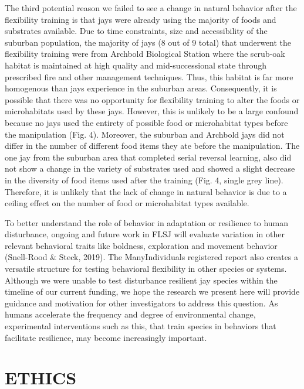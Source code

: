 \documentclass[
]{article}
\begin{document}
The third potential reason we failed to see a change in natural behavior
after the flexibility training is that jays were already using the
majority of foods and substrates available. Due to time constraints,
size and accessibility of the suburban population, the majority of jays
(8 out of 9 total) that underwent the flexibility training were from
Archbold Biological Station where the scrub-oak habitat is maintained at
high quality and mid-successional state through prescribed fire and
other management techniques. Thus, this habitat is far more homogenous
than jays experience in the suburban areas. Consequently, it is possible
that there was no opportunity for flexibility training to alter the
foods or microhabitats used by these jays. However, this is unlikely to
be a large confound because no jays used the entirety of possible food
or microhabitat types before the manipulation (Fig. 4). Moreover, the
suburban and Archbold jays did not differ in the number of different
food items they ate before the manipulation. The one jay from the
suburban area that completed serial reversal learning, also did not show
a change in the variety of substrates used and showed a slight decrease
in the diversity of food items used after the training (Fig. 4, single
grey line). Therefore, it is unlikely that the lack of change in natural
behavior is due to a ceiling effect on the number of food or
microhabitat types available.

To better understand the role of behavior in adaptation or resilience to
human disturbance, ongoing and future work in FLSJ will evaluate
variation in other relevant behavioral traits like boldness, exploration
and movement behavior (Snell-Rood \& Steck, 2019). The ManyIndividuals
registered report also creates a versatile structure for testing
behavioral flexibility in other species or systems. Although we were
unable to test disturbance resilient jay species within the timeline of
our current funding, we hope the research we present here will provide
guidance and motivation for other investigators to address this
question. As humans accelerate the frequency and degree of environmental
change, experimental interventions such as this, that train species in
behaviors that facilitate resilience, may become increasingly important.

\section{\texorpdfstring{\textbf{ETHICS}}{ETHICS}}\label{ethics}
\end{document}
